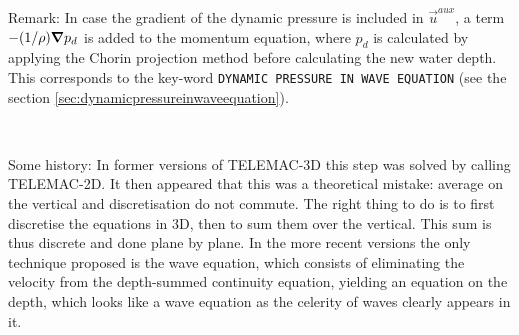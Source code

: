 \begin{CommentBlock}{Remark:}
In case the gradient of the dynamic pressure is included in $\vec{u}^{aux}$,
a term $-(1/\rho)\bm{\nabla} p_{d}$ is added to
the momentum equation, where $p_{d}$ is calculated by applying the Chorin
projection method before calculating the new water depth.
This corresponds to the key-word \texttt{DYNAMIC PRESSURE IN WAVE EQUATION}
(see the section \ref{sec:dynamicpressureinwaveequation}).
\end{CommentBlock}
\\

\begin{CommentBlock}{Some history:}
In former versions of TELEMAC-3D this step was solved by
calling TELEMAC-2D. It then appeared that this was a theoretical
mistake: average on the vertical and discretisation do not commute. The right
thing to do is to first discretise the equations in 3D, then to sum them over
the vertical. This sum is thus discrete and done plane by plane. In the more
recent versions the only technique proposed is the wave equation, which
consists of eliminating the velocity from the depth-summed continuity equation,
yielding an equation on the depth, which looks like a wave equation as the celerity
of waves clearly appears in it.
\end{CommentBlock}

